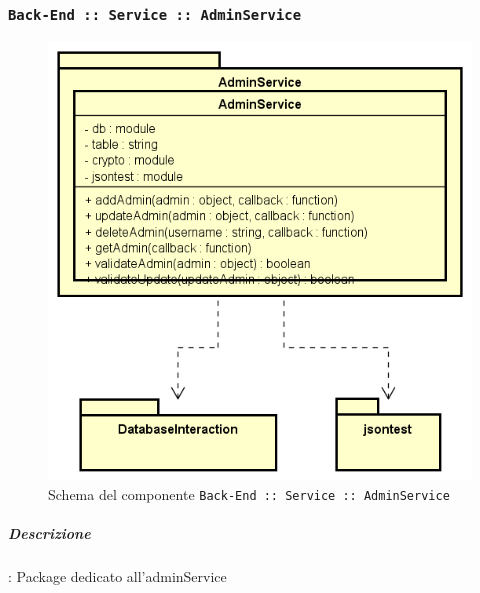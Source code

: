 \documentclass[../DefinizioneDiProdotto_v3.0.0.tex]{subfiles}
\begin{document}
\subsubsection{\texttt{Back-End :: Service :: AdminService}}
\begin{figure}[!h]
	\centering
	\includegraphics[scale=0.7]{Architettura/Back-End/Service/AdminService.png}
	\caption{Schema del componente \texttt{Back-End :: Service :: AdminService}}
\end{figure}
\subparagraph{Descrizione}: Package dedicato all'adminService
\end{document}
